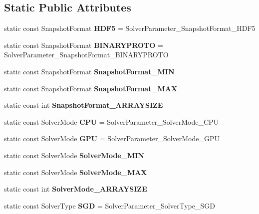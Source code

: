 \subsection*{Static Public Attributes}
\begin{DoxyCompactItemize}
\item 
\mbox{\label{classcaffe_1_1_solver_parameter_afce8f11730027852925d311d81e9cd1b}} 
static const Snapshot\+Format {\bfseries H\+D\+F5} = Solver\+Parameter\+\_\+\+Snapshot\+Format\+\_\+\+H\+D\+F5
\item 
\mbox{\label{classcaffe_1_1_solver_parameter_a1da4d5d842d4019d42d08206aa9c7619}} 
static const Snapshot\+Format {\bfseries B\+I\+N\+A\+R\+Y\+P\+R\+O\+TO} = Solver\+Parameter\+\_\+\+Snapshot\+Format\+\_\+\+B\+I\+N\+A\+R\+Y\+P\+R\+O\+TO
\item 
static const Snapshot\+Format {\bfseries Snapshot\+Format\+\_\+\+M\+IN}
\item 
static const Snapshot\+Format {\bfseries Snapshot\+Format\+\_\+\+M\+AX}
\item 
static const int {\bfseries Snapshot\+Format\+\_\+\+A\+R\+R\+A\+Y\+S\+I\+ZE}
\item 
\mbox{\label{classcaffe_1_1_solver_parameter_a069221bd64c3b47c5dc1e3baadd81c49}} 
static const Solver\+Mode {\bfseries C\+PU} = Solver\+Parameter\+\_\+\+Solver\+Mode\+\_\+\+C\+PU
\item 
\mbox{\label{classcaffe_1_1_solver_parameter_a70b4c8ff4e8ec52a107babe5e6d4d86f}} 
static const Solver\+Mode {\bfseries G\+PU} = Solver\+Parameter\+\_\+\+Solver\+Mode\+\_\+\+G\+PU
\item 
static const Solver\+Mode {\bfseries Solver\+Mode\+\_\+\+M\+IN}
\item 
static const Solver\+Mode {\bfseries Solver\+Mode\+\_\+\+M\+AX}
\item 
static const int {\bfseries Solver\+Mode\+\_\+\+A\+R\+R\+A\+Y\+S\+I\+ZE}
\item 
\mbox{\label{classcaffe_1_1_solver_parameter_ad1c1749e24b2707605a26d89a004042d}} 
static const Solver\+Type {\bfseries S\+GD} = Solver\+Parameter\+\_\+\+Solver\+Type\+\_\+\+S\+GD
\item 

\end{DoxyCompactItemize}
